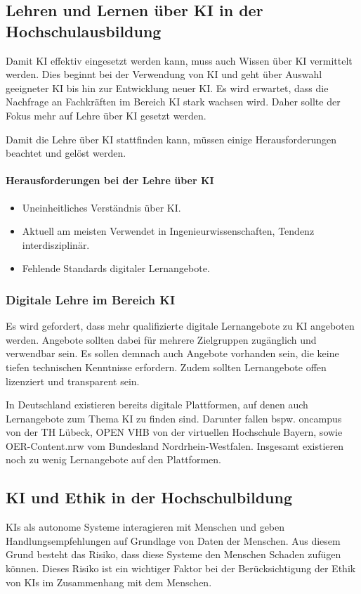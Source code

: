 \subsection{Lehren und Lernen über KI in der Hochschulausbildung}
Damit KI effektiv eingesetzt werden kann, muss auch Wissen über KI vermittelt werden. Dies beginnt bei der Verwendung von KI und geht über Auswahl geeigneter KI bis hin zur Entwicklung neuer KI. Es wird erwartet, dass die Nachfrage an Fachkräften im Bereich KI stark wachsen wird. Daher sollte der Fokus mehr auf Lehre über KI gesetzt werden.

Damit die Lehre über KI stattfinden kann, müssen einige Herausforderungen beachtet und gelöst werden.

\paragraph*{Herausforderungen bei der Lehre über KI}
\begin{itemize}
    \item Uneinheitliches Verständnis über KI.
    \item Aktuell am meisten Verwendet in Ingenieurwissenschaften, Tendenz interdisziplinär.
    \item Fehlende Standards digitaler Lernangebote.
\end{itemize}

\subsubsection*{Digitale Lehre im Bereich KI}
Es wird gefordert, dass mehr qualifizierte digitale Lernangebote zu KI angeboten werden. Angebote sollten dabei für mehrere Zielgruppen zugänglich und verwendbar sein. Es sollen demnach auch Angebote vorhanden sein, die keine tiefen technischen Kenntnisse erfordern. Zudem sollten Lernangebote offen lizenziert und transparent sein.

In Deutschland existieren bereits digitale Plattformen, auf denen auch Lernangebote zum Thema KI zu finden sind. Darunter fallen bspw. oncampus von der TH Lübeck, OPEN VHB von der virtuellen Hochschule Bayern, sowie OER-Content.nrw vom Bundesland Nordrhein-Westfalen. Insgesamt existieren noch zu wenig Lernangebote auf den Plattformen.

\subsection{KI und Ethik in der Hochschulbildung}
KIs als autonome Systeme interagieren mit Menschen und geben Handlungsempfehlungen auf Grundlage von Daten der Menschen. Aus diesem Grund besteht das Risiko, dass diese Systeme den Menschen Schaden zufügen können. Dieses Risiko ist ein wichtiger Faktor bei der Berücksichtigung der Ethik von KIs im Zusammenhang mit dem Menschen.

